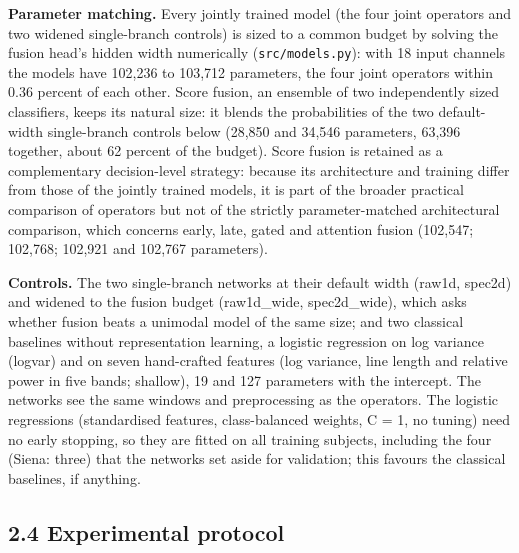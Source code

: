 \documentclass[11pt,a4paper]{article}
\begin{document}
\textbf{Parameter matching.} Every jointly trained model (the four joint operators and two
widened single-branch controls) is sized to a common budget by solving the fusion
head's hidden width numerically (\nolinkurl{src/models.py}): with 18 input channels the models
have 102,236 to 103,712 parameters, the four joint operators within 0.36 percent of
each other. Score fusion, an ensemble of two independently sized classifiers, keeps
its natural size: it blends the probabilities of the two default-width single-branch
controls below (28,850 and 34,546 parameters, 63,396 together, about 62 percent of the
budget). Score fusion is retained as a complementary decision-level strategy: because
its architecture and training differ from those of the jointly trained models, it is
part of the broader practical comparison of operators but not of the strictly
parameter-matched architectural comparison, which concerns early, late, gated and
attention fusion (102,547; 102,768; 102,921 and 102,767 parameters).

\textbf{Controls.} The two single-branch networks at their default width (raw1d, spec2d)
and widened to the fusion budget (raw1d\_wide, spec2d\_wide), which asks whether fusion
beats a unimodal model of the same size; and two classical baselines without
representation learning, a logistic regression on log variance (logvar) and on seven
hand-crafted features (log variance, line length and relative power in five bands;
shallow), 19 and 127 parameters with the intercept. The networks see the same windows
and preprocessing as the operators. The logistic regressions (standardised features,
class-balanced weights, C = 1, no tuning) need no early stopping, so they are fitted
on all training subjects, including the four (Siena: three) that the networks set aside
for validation; this favours the classical baselines, if anything.

\subsection{2.4 Experimental protocol}\label{experimental-protocol}
\end{document}
